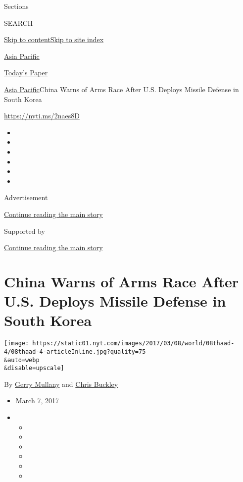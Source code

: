 Sections

SEARCH

\protect\hyperlink{site-content}{Skip to
content}\protect\hyperlink{site-index}{Skip to site index}

\href{https://www.nytimes.com/section/world/asia}{Asia Pacific}

\href{https://myaccount.nytimes.com/auth/login?response_type=cookie\&client_id=vi}{}

\href{https://www.nytimes.com/section/todayspaper}{Today's Paper}

\href{/section/world/asia}{Asia Pacific}\textbar{}China Warns of Arms
Race After U.S. Deploys Missile Defense in South Korea

\url{https://nyti.ms/2naes8D}

\begin{itemize}
\item
\item
\item
\item
\item
\item
\end{itemize}

Advertisement

\protect\hyperlink{after-top}{Continue reading the main story}

Supported by

\protect\hyperlink{after-sponsor}{Continue reading the main story}

\hypertarget{china-warns-of-arms-race-after-us-deploys-missile-defense-in-south-korea}{%
\section{China Warns of Arms Race After U.S. Deploys Missile Defense in
South
Korea}\label{china-warns-of-arms-race-after-us-deploys-missile-defense-in-south-korea}}

\texttt{[image: https://static01.nyt.com/images/2017/03/08/world/08thaad-4/08thaad-4-articleInline.jpg?quality=75\\\&auto=webp\\\&disable=upscale]}

By \href{http://www.nytimes.com/by/gerry-mullany}{Gerry Mullany} and
\href{http://www.nytimes.com/by/chris-buckley}{Chris Buckley}

\begin{itemize}
\item
  March 7, 2017
\item
  \begin{itemize}
  \item
  \item
  \item
  \item
  \item
  \item
  \end{itemize}
\end{itemize}

